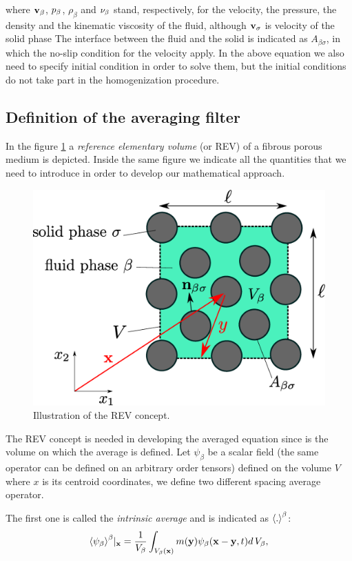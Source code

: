 where $\textbf{v}_{\beta}$, $p_{\beta}$, $\rho_{\beta}$ and $\nu_{\beta}$ stand, respectively, for  the velocity, the pressure, the density and the kinematic viscosity of the fluid, although  $\textbf{v}_{\sigma}$ is velocity of the solid phase
The interface between the fluid and the solid is indicated as $A_{\beta\sigma}$, in which the no-slip condition for the velocity apply.
In the above equation we also need to specify initial condition in order to solve them, but the initial conditions do not take part in the homogenization procedure.

\subsection{Definition of the averaging filter}

In the figure \ref{fig:rev} a \textit{reference elementary volume} (or REV) of a fibrous porous medium is depicted.
Inside the same figure we indicate all the quantities that we need to introduce in order to develop our mathematical approach.

\begin{figure}[h]
	\centering
	\includegraphics[width=0.7\linewidth]{chapter_2/figure/REV}
	\caption{Illustration of the REV concept.}
	\label{fig:rev}
\end{figure}

The REV concept is needed in developing the averaged equation since is the volume on which the average is defined.
Let $\psi_{\beta}$ be a scalar field (the same operator can be defined on an arbitrary order tensors) defined on the volume $V$ where $x$ is its centroid coordinates, we define two different spacing average operator.

The first one is called the \textit{intrinsic average} and is indicated as ${\left< . \right>}^{\beta}$:
\begin{equation}
{\left< \psi_{\beta} \right>}^{\beta}|_{\mathbf{x}} = \dfrac{1}{V_\beta} \int_{V_\beta(\mathbf{x})}  m(\mathbf{y}) \psi_{\beta}(\mathbf{x}-\mathbf{y}, t) d \, V_\beta,
\label{eq:avg_intrinsic}
\end{equation}


